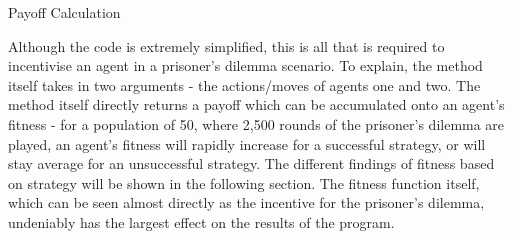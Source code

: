 \documentclass[12pt,a4paper]{article}
\begin{document}
\begin{algorithm}[H]
\caption{Payoff Calculation}\label{euclid}
\begin{algorithmic}[1]

\EndIf

\EndIf

\EndIf

\EndIf

\EndProcedure
\end{algorithmic}
\end{algorithm}

Although the code is extremely simplified, this is all that is required to incentivise an agent in a prisoner's dilemma scenario. To explain, the method itself takes in two arguments - the actions/moves of agents one and two. The method itself directly returns a payoff which can be accumulated onto an agent's fitness - for a population of 50, where 2,500 rounds of the prisoner's dilemma are played, an agent's fitness will rapidly increase for a successful strategy, or will stay average for an unsuccessful strategy. The different findings of fitness based on strategy will be shown in the following section. The fitness function itself, which can be seen almost directly as the incentive for the prisoner's dilemma, undeniably has the largest effect on the results of the program.
\end{document}
